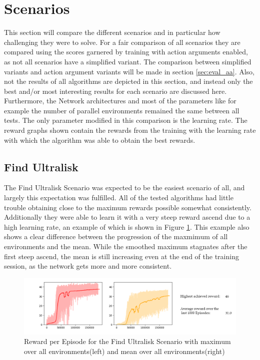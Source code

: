 \section{Scenarios}
This section will compare the different scenarios and in particular how challenging they were to solve. For a fair comparison of all scenarios they are compared using the scores garnered by training with action arguments enabled, as not all scenarios have a simplified variant. The comparison between simplified variants and action argument variants will be made in section \ref{sec:eval_aa}. Also, not the results of all algorithms are depicted in this section, and instead only the best and/or most interesting results for each scenario are discussed here. Furthermore, the Network architectures and most of the parameters like for example the number of parallel environments remained the same between all tests. The only parameter modified in this comparison is the learning rate. The reward graphs shown contain the rewards from the training with the learning rate with which the algorithm was able to obtain the best rewards. 

\subsection{Find Ultralisk}
The Find Ultralisk Scenario was expected to be the easiest scenario of all, and largely this expectation was fulfilled. All of the tested algorithms had little trouble obtaining close to the maximum rewards possible somewhat consistently. Additionally they were able to learn it with a very steep reward ascend due to a high learning rate, an example of which is shown in Figure \ref{fig:fu_rew}. This example also shows a clear difference between the progression of the maxmimum of all environments and the mean. While the smoothed maximum stagnates after the first steep ascend, the mean is still increasing even at the end of the training session, as the network gets more and more consistent. 

\begin{figure}[htb]
  \centering
      \includegraphics[width=1\textwidth]{Figures/plots/plot_fu_acktr_coord.png}
  \caption{Reward per Episode for the Find Ultralisk Scenario with maximum over all environments(left) and mean over all environments(right)}
  \label{fig:fu_rew}
\end{figure}





